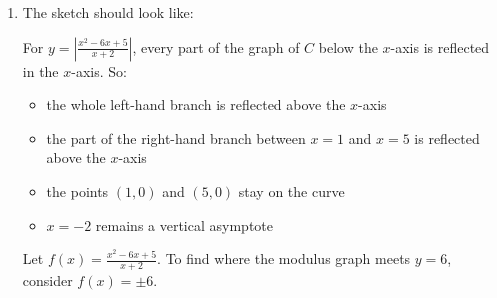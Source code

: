 \documentclass[leqno]{article}
\begin{document}
\begin{enumerate}[
  label=\textbf{\arabic*.},
  leftmargin=*,
  topsep=0pt,
  partopsep=0pt,
  parsep=0pt
]
\begin{djsSolution}
\begin{enumerate}[label=\textbf{(\alph*)}]
  So the curve meets the \(x\)-axis at
  \[
  (1,0)\quad\text{and}\quad(5,0)
  \]

  For the \(y\)-axis, set \(x=0\):
  \[
  y=\frac{0^2-6(0)+5}{0+2}=\frac52
  \]

  so the curve meets the \(y\)-axis at
  \[
  \left(0,\frac52\right)
  \]

  The left-hand branch lies below the \(x\)-axis for \(x<-2\), and the right-hand branch falls from \(+\infty\), crosses at \((1,0)\), reaches the minimum found in part (b), then rises through \((5,0)\).

  \item The sketch should look like:\par\nopagebreak


  For \(y=\left|\frac{x^2-6x+5}{x+2}\right|\), every part of the graph of \(C\) below the \(x\)-axis is reflected in the \(x\)-axis. So:

  \begin{itemize}
    \item the whole left-hand branch is reflected above the \(x\)-axis
    \item the part of the right-hand branch between \(x=1\) and \(x=5\) is reflected above the \(x\)-axis
    \item the points \((1,0)\) and \((5,0)\) stay on the curve
    \item \(x=-2\) remains a vertical asymptote
  \end{itemize}

  Let \(f(x)=\frac{x^2-6x+5}{x+2}\). To find where the modulus graph meets \(y=6\), consider \(f(x)=\pm6\).


\end{enumerate}
\end{djsSolution}
\end{enumerate}
\end{document}
